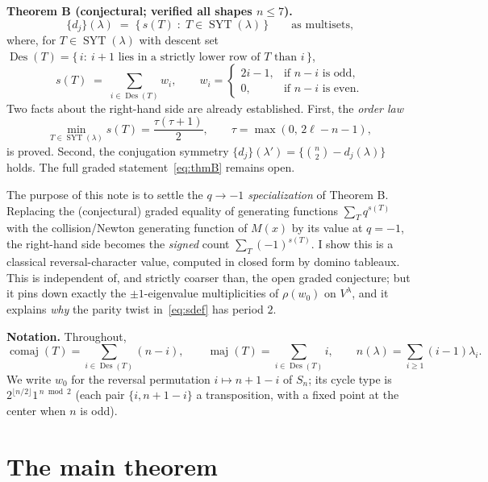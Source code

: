 \documentclass[11pt]{article}
\theoremstyle{definition}
\DeclareMathOperator{\Des}{Des}
\DeclareMathOperator{\maj}{maj}
\DeclareMathOperator{\comaj}{comaj}
\DeclareMathOperator{\SYT}{SYT}
\newcommand{\wzero}{w_0}
\newcommand{\Vlam}{V^\lambda}
\begin{document}
\medskip
\noindent\textbf{Theorem B (conjectural; verified all shapes $n\le 7$).}
\begin{equation}\label{eq:thmB}
\{d_j\}(\lambda)\;=\;\bigl\{\,s(T)\;:\;T\in\SYT(\lambda)\,\bigr\}
\qquad\text{as multisets,}
\end{equation}
where, for $T\in\SYT(\lambda)$ with descent set
$\Des(T)=\{\,i:\ i+1\text{ lies in a strictly lower row of }T\text{ than }i\,\}$,
\begin{equation}\label{eq:sdef}
s(T)\;=\;\sum_{i\in\Des(T)}w_i,\qquad
w_i=\begin{cases}2i-1,&\text{if }n-i\text{ is odd},\\[2pt]0,&\text{if }n-i\text{ is even.}\end{cases}
\end{equation}
Two facts about the right-hand side are already established.  First, the
\emph{order law}
\[
\min_{T\in\SYT(\lambda)}s(T)=\frac{\tau(\tau+1)}{2},\qquad \tau=\max(0,\,2\ell-n-1),
\]
is proved.  Second, the conjugation symmetry $\{d_j\}(\lambda')=\{\binom n2-d_j(\lambda)\}$
holds.  The full graded statement~\eqref{eq:thmB} remains open.

\medskip
The purpose of this note is to settle the \emph{$q\to-1$ specialization} of
Theorem B.  Replacing the (conjectural) graded equality of generating functions
$\sum_T q^{s(T)}$ with the collision/Newton generating function of $M(x)$ by its
value at $q=-1$, the right-hand side becomes the \emph{signed} count
$\sum_T(-1)^{s(T)}$.  I show this is a classical reversal-character value,
computed in closed form by domino tableaux.  This is independent of, and
strictly coarser than, the open graded conjecture; but it pins down exactly the
$\pm1$-eigenvalue multiplicities of $\rho(\wzero)$ on $\Vlam$, and it explains
\emph{why} the parity twist in~\eqref{eq:sdef} has period $2$.

\medskip
\noindent\textbf{Notation.}  Throughout,
\[
\comaj(T)=\sum_{i\in\Des(T)}(n-i),\qquad
\maj(T)=\sum_{i\in\Des(T)}i,\qquad
n(\lambda)=\sum_{i\ge1}(i-1)\lambda_i.
\]
We write $\wzero$ for the reversal permutation $i\mapsto n+1-i$ of $S_n$; its cycle
type is $2^{\lfloor n/2\rfloor}1^{\,n\bmod 2}$ (each pair $\{i,n+1-i\}$ a
transposition, with a fixed point at the center when $n$ is odd).

\section{The main theorem}
\end{document}
